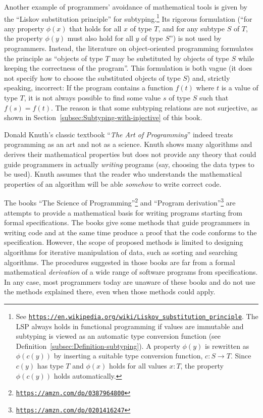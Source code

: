 Another example of programmers\textsf{'} avoidance of mathematical tools is
given by the \textsf{``}Liskov substitution principle\textsf{''}
for subtyping.\footnote{See \texttt{\href{https://en.wikipedia.org/wiki/Liskov_substitution_principle}{https://en.wikipedia.org/wiki/Liskov\_substitution\_principle}}.
The LSP always holds in functional programming if values are immutable
and subtyping is viewed as an automatic type conversion function (see
Definition~\ref{subsec:Definition-subtyping}). A property $\phi(y)$
is rewritten as $\phi(c(y))$ by inserting a suitable type conversion
function, $c:S\rightarrow T$. Since $c(y)$ has type $T$ and $\phi(x)$
holds for all values $x:T$,  the property $\phi(c(y))$ holds automatically.} Its rigorous formulation (\textsf{``}for any property $\phi(x)$ that holds
for all $x$ of type $T$, and for any subtype $S$ of $T$, the property
$\phi(y)$ must also hold for all $y$ of type $S$\textsf{''}) is not used
by programmers. Instead, the literature on object-oriented programming
formulates the principle as \textsf{``}objects of type $T$ may be substituted
by objects of type $S$ while keeping the correctness of the program\textsf{''}.
This formulation  is both vague
(it does not specify how to choose the substituted objects of type
$S$) and, strictly speaking, incorrect: If the program contains a
function $f(t)$ where $t$ is a value of type $T$, it is not always
possible to find some value $s$ of type $S$ such that $f(s)=f(t)$.
The reason is that some subtyping relations are not surjective, as
shown in Section~\ref{subsec:Subtyping-with-injective} of this book.

Donald Knuth\textsf{'}s classic textbook \textsf{``}\emph{The Art of Programming}\textsf{''}
indeed treats programming as an art and not as a science. Knuth shows
many algorithms and derives their mathematical properties but does
not provide any theory that could guide programmers in actually \emph{writing}
programs (say, choosing the data types to be used). Knuth assumes
that the reader who understands the mathematical properties of an
algorithm will be able \emph{somehow} to write correct code.

The books \textsf{``}The Science of Programming\textsf{''}\footnote{\texttt{\href{https://amzn.com/dp/0387964800}{https://amzn.com/dp/0387964800}}}
and \textsf{``}Program derivation\textsf{''}\footnote{\texttt{\href{https://amzn.com/dp/0201416247}{https://amzn.com/dp/0201416247}}}
are attempts to provide a mathematical basis for writing programs
starting from formal specifications. The books give some methods that
guide programmers in writing code and at the same time produce a proof
that the code conforms to the specification. However, the scope of
proposed methods is limited to designing algorithms for iterative
manipulation of data, such as sorting and searching algorithms. The
procedures suggested in those books are far from a formal mathematical
\emph{derivation} of a wide range of software programs from specifications.
In any case, most programmers today are unaware of these books and
do not use the methods explained there, even when those methods could
apply.

